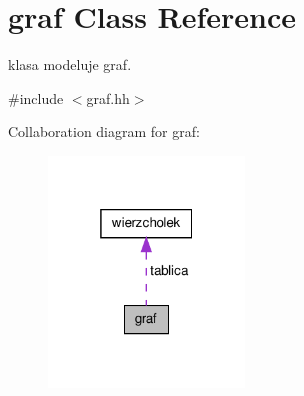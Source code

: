 \hypertarget{classgraf}{\section{graf \-Class \-Reference}
\label{classgraf}
}


klasa modeluje graf.  




{\ttfamily \#include $<$graf.\-hh$>$}



\-Collaboration diagram for graf\-:
\nopagebreak
\begin{figure}[H]
\begin{center}
\leavevmode
\includegraphics[width=148pt]{classgraf__coll__graph}
\end{center}
\end{figure}
